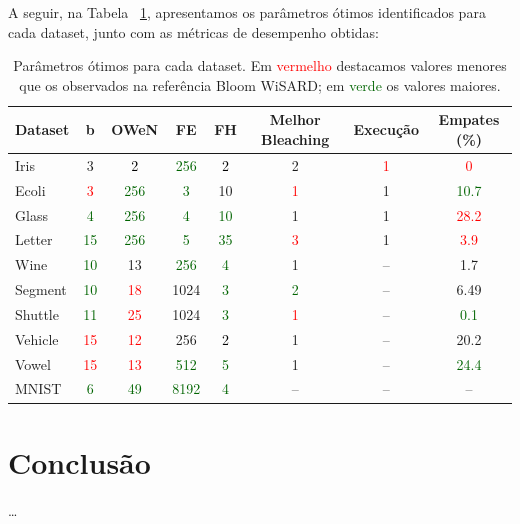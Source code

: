 \documentclass{article}
\begin{document}
A seguir, na Tabela ~\ref{tab:Opt-params}, apresentamos os parâmetros ótimos identificados para cada dataset, junto com as métricas de desempenho obtidas:

{\small
\begin{table}[H]
\caption{Parâmetros ótimos para cada dataset. Em \textcolor{red}{vermelho} destacamos valores menores que os observados na referência Bloom WiSARD; em \textcolor{darkgreen}{verde} os valores maiores.}
\label{tab:Opt-params}
\renewcommand{\arraystretch}{1.1}
\begin{center}
\begin{tabular}{lccccccc}
\hline
\textbf{Dataset} & \textbf{b} & \textbf{OWeN} & \textbf{FE} & \textbf{FH} & \textbf{Melhor Bleaching} & \textbf{Execução} & \textbf{Empates (\%)} \\
\hline
Iris & 3 & \textcolor{black}{2} & \textcolor{darkgreen}{256} & \textcolor{black}{2} & 2 & \textcolor{red}{1} & \textcolor{red}{0} \\
Ecoli & \textcolor{red}{3} & \textcolor{darkgreen}{256} & \textcolor{darkgreen}{3} & 10 & \textcolor{red}{1} & 1 & \textcolor{darkgreen}{10.7} \\
Glass & \textcolor{darkgreen}{4} & \textcolor{darkgreen}{256} & \textcolor{darkgreen}{4} & \textcolor{darkgreen}{10} & 1 & 1 & \textcolor{red}{28.2} \\
Letter & \textcolor{darkgreen}{15} & \textcolor{darkgreen}{256} & \textcolor{darkgreen}{5} & \textcolor{darkgreen}{35} & \textcolor{red}{3} & 1 & \textcolor{red}{3.9} \\
Wine & \textcolor{darkgreen}{10} & 13 & \textcolor{darkgreen}{256} & \textcolor{darkgreen}{4} & 1 & -- & 1.7 \\
Segment & \textcolor{darkgreen}{10} & \textcolor{red}{18} & 1024 & \textcolor{darkgreen}{3} & \textcolor{darkgreen}{2} & -- & 6.49 \\
Shuttle & \textcolor{darkgreen}{11} & \textcolor{red}{25} & 1024 & \textcolor{darkgreen}{3} & \textcolor{red}{1} & -- & \textcolor{darkgreen}{0.1} \\
Vehicle & \textcolor{red}{15} & \textcolor{red}{12} & 256 & \textcolor{black}{2} & 1 & -- & 20.2 \\
Vowel & \textcolor{red}{15} & \textcolor{red}{13} & \textcolor{darkgreen}{512} & \textcolor{darkgreen}{5} & 1 & -- & \textcolor{darkgreen}{24.4} \\
MNIST & \textcolor{darkgreen}{6} & \textcolor{darkgreen}{49} & \textcolor{darkgreen}{8192} & \textcolor{darkgreen}{4} & -- & -- & -- \\
\hline
\end{tabular}
\end{center}
\end{table}
}

\section{Conclusão}

\ldots



\end{document}
